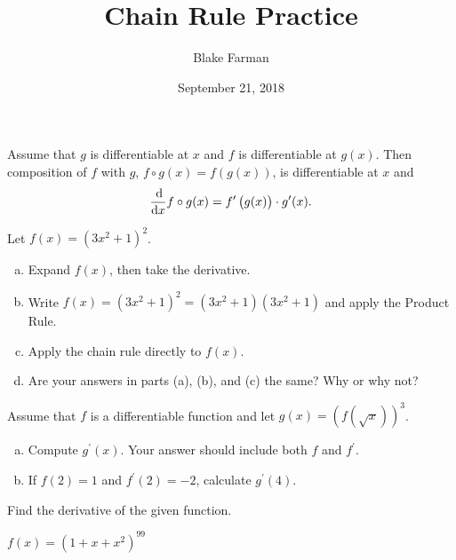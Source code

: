 \documentclass[10pt]{amsart}
\title[Chain Rule]{Chain Rule Practice}
\date{September 21, 2018}
\author{Blake Farman}
\begin{document}
\maketitle

\makenameslot

\begin{thm*}
  Assume that \(g\) is differentiable at \(x\) and \(f\) is differentiable at \(g(x)\).
  Then composition of \(f\) with \(g\), \(f \circ g(x) = f\left(g(x)\right)\), is differentiable at \(x\) and
  \[\frac{\dif}{\dif x} f \circ g(x) = f^\prime\left(g(x)\right)\cdot g^\prime(x).\]
\end{thm*}

\begin{thm}
  Let \(f(x) = (3x^2 + 1)^2\).
  
  \begin{enumerate}[(a)]
  \item
    Expand \(f(x)\), then take the derivative.
    \vspace{1in}
  \item
    Write \(f(x) = (3x^2 + 1)^2 = (3x^2 + 1)(3x^2 + 1)\) and apply the Product Rule.
    \vspace{1in}
  \item
    Apply the chain rule directly to \(f(x)\).
    \newpage
  \item
    Are your answers in parts (a), (b), and (c) the same?
    Why or why not?
    \vspace{1.5in}
  \end{enumerate}
\end{thm}

\begin{thm}
  Assume that \(f\) is a differentiable function and let \(g(x) = \left(f\left(\sqrt{x}\right)\right)^3\).
  \begin{enumerate}[(a)]
  \item
    Compute \(g^\prime(x)\).  Your answer should include both \(f\) and \(f^\prime\).
    \vspace{2in}
  \item
    If \(f(2) = 1\) and \(f^\prime(2) = -2\), calculate \(g^\prime(4)\).
    \vspace{1in}
  \end{enumerate}
\end{thm}

Find the derivative of the given function.
\begin{thm}
  \(f(x) = (1 + x + x^2)^{99}\)
\end{thm}
\vspace{1.5in}
\end{document}
